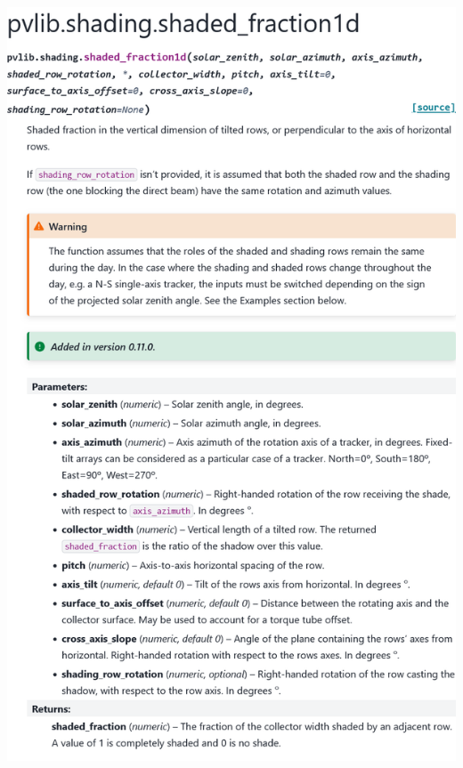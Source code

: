 \begin{myparindent}{0pt}
\includegraphics[width=\linewidth,height=0.9\textheight,keepaspectratio]{images/docs_funcs_cut/shaded_fraction1d_0.png}


\end{myparindent}
